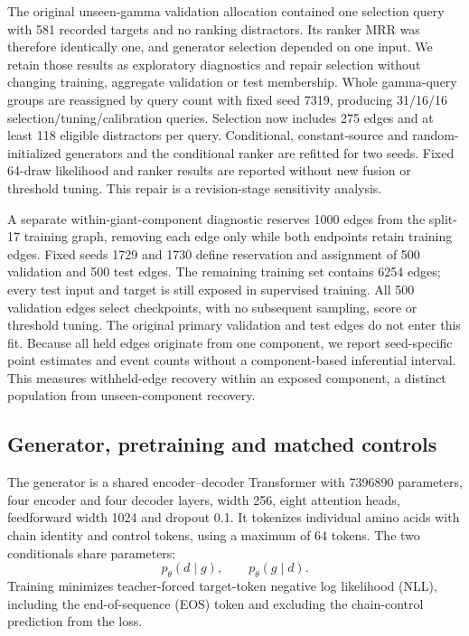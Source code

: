 \documentclass[12pt]{article}
\begin{document}
The original unseen-gamma validation allocation contained one selection query
with 581 recorded targets and no ranking distractors. Its ranker MRR was
therefore identically one, and generator selection depended on one input. We
retain those results as exploratory diagnostics and repair selection without
changing training, aggregate validation or test membership. Whole gamma-query
groups are reassigned by query count with fixed seed 7319, producing 31/16/16
selection/tuning/calibration queries. Selection now includes 275 edges and at
least 118 eligible distractors per query. Conditional, constant-source and
random-initialized generators and the conditional ranker are refitted for two
seeds. Fixed 64-draw likelihood and ranker results are reported without new
fusion or threshold tuning. This repair is a revision-stage sensitivity analysis.

A separate within-giant-component diagnostic reserves 1000 edges from the
split-17 training graph, removing each edge only while both endpoints retain
training edges. Fixed seeds 1729 and 1730 define reservation and assignment of
500 validation and 500 test edges. The remaining training set contains 6254
edges; every test input and target is still exposed in supervised training.
All 500 validation edges select checkpoints, with no subsequent sampling,
score or threshold tuning. The original primary validation and test edges do
not enter this fit. Because all held edges originate from one component, we
report seed-specific point estimates and event counts without a component-based
inferential interval. This measures withheld-edge recovery within an exposed
component, a distinct population from unseen-component recovery.


\subsection{Generator, pretraining and matched controls}
The generator is a shared encoder--decoder Transformer with 7396890 parameters,
four encoder and four decoder layers, width 256, eight attention heads,
feedforward width 1024 and dropout 0.1. It tokenizes individual amino acids with
chain identity and control tokens, using a maximum of 64 tokens. The two
conditionals share parameters:
\begin{equation}
p_\theta(d\mid g),\qquad p_\theta(g\mid d).
\end{equation}
Training minimizes teacher-forced target-token negative log likelihood (NLL),
including the end-of-sequence (EOS) token and excluding the chain-control
prediction from the loss.
\end{document}
